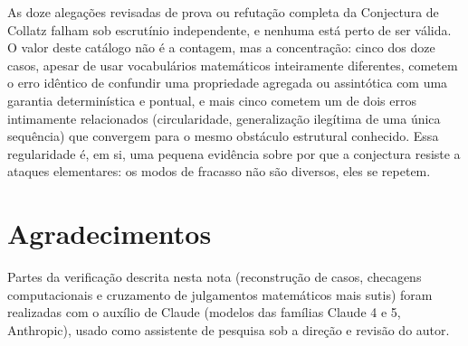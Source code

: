 \documentclass[11pt]{article}
\begin{document}
As doze alegações revisadas de prova ou refutação completa da
Conjectura de Collatz falham sob escrutínio independente, e nenhuma
está perto de ser válida. O valor deste catálogo não é a contagem, mas
a concentração: cinco dos doze casos, apesar de usar vocabulários
matemáticos inteiramente diferentes, cometem o erro idêntico de
confundir uma propriedade agregada ou assintótica com uma garantia
determinística e pontual, e mais cinco cometem um de dois erros
intimamente relacionados (circularidade, generalização ilegítima de
uma única sequência) que convergem para o mesmo obstáculo estrutural
conhecido. Essa regularidade é, em si, uma pequena evidência sobre por
que a conjectura resiste a ataques elementares: os modos de fracasso
não são diversos, eles se repetem.

\section*{Agradecimentos}

Partes da verificação descrita nesta nota (reconstrução de casos,
checagens computacionais e cruzamento de julgamentos matemáticos mais
sutis) foram realizadas com o auxílio de Claude (modelos das famílias
Claude 4 e 5, Anthropic), usado como assistente de pesquisa sob a
direção e revisão do autor.
\end{document}
